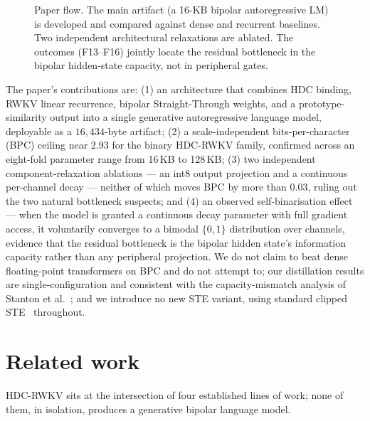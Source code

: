 \documentclass[runningheads]{llncs}
\begin{document}
\begin{figure}[t]
\caption{Paper flow. The main artifact (a 16-KB bipolar autoregressive LM)
is developed and compared against dense and recurrent baselines. Two
independent architectural relaxations are ablated. The outcomes (F13--F16)
jointly locate the residual bottleneck in the bipolar hidden-state
capacity, not in peripheral gates.}
\label{fig:flow}
\end{figure}

The paper's contributions are:
(1) an architecture that combines HDC binding, RWKV linear recurrence,
bipolar Straight-Through weights, and a prototype-similarity output into
a single generative autoregressive language model, deployable as a
$16{,}434$-byte artifact;
(2) a scale-independent bits-per-character (BPC) ceiling near $2.93$
for the binary HDC-RWKV family, confirmed across an eight-fold parameter
range from 16\,KB to 128\,KB;
(3) two independent component-relaxation ablations --- an int8 output
projection and a continuous per-channel decay --- neither of which moves
BPC by more than $0.03$, ruling out the two natural bottleneck suspects;
and
(4) an observed self-binarisation effect --- when the model is granted a
continuous decay parameter with full gradient access, it voluntarily
converges to a bimodal $\{0,1\}$ distribution over channels, evidence
that the residual bottleneck is the bipolar hidden state's information
capacity rather than any peripheral projection.
We do not claim to beat dense floating-point transformers on BPC and do
not attempt to; our distillation results are single-configuration and
consistent with the capacity-mismatch analysis of
Stanton et al.~\cite{stanton2021does}; and we introduce no new STE variant,
using standard clipped STE~\cite{courbariaux2016binaryconnect} throughout.


\section{Related work}
\label{sec:related}

HDC-RWKV sits at the intersection of four established lines of work; none
of them, in isolation, produces a generative bipolar language model.
\end{document}
